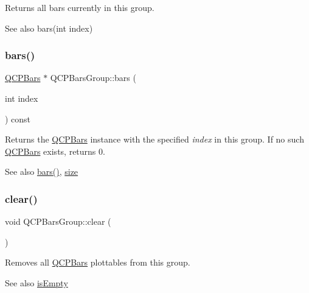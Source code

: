 Returns all bars currently in this group.

\begin{DoxySeeAlso}{See also}
bars(int index) 
\end{DoxySeeAlso}
\hypertarget{class_q_c_p_bars_group_a0754d659a020aa7fddfe81e657ce2d92}{}\label{class_q_c_p_bars_group_a0754d659a020aa7fddfe81e657ce2d92} 
\subsubsection{\texorpdfstring{bars()}{bars()}\hspace{0.1cm}{\footnotesize\ttfamily [2/2]}}
{\footnotesize\ttfamily \hyperlink{class_q_c_p_bars}{Q\+C\+P\+Bars} $\ast$ Q\+C\+P\+Bars\+Group\+::bars (\begin{DoxyParamCaption}\item[{int}]{index }\end{DoxyParamCaption}) const}

Returns the \hyperlink{class_q_c_p_bars}{Q\+C\+P\+Bars} instance with the specified {\itshape index} in this group. If no such \hyperlink{class_q_c_p_bars}{Q\+C\+P\+Bars} exists, returns 0.

\begin{DoxySeeAlso}{See also}
\hyperlink{class_q_c_p_bars_group_a6e4f4e86abbec6a9342f204ef82abef8}{bars()}, \hyperlink{class_q_c_p_bars_group_a3780ec77919cb00840207ec7a0f00dd5}{size} 
\end{DoxySeeAlso}
\hypertarget{class_q_c_p_bars_group_a3ddf23928c6cd89530bd34ab7ba7b177}{}\label{class_q_c_p_bars_group_a3ddf23928c6cd89530bd34ab7ba7b177} 
\subsubsection{\texorpdfstring{clear()}{clear()}}
{\footnotesize\ttfamily void Q\+C\+P\+Bars\+Group\+::clear (\begin{DoxyParamCaption}{ }\end{DoxyParamCaption})}

Removes all \hyperlink{class_q_c_p_bars}{Q\+C\+P\+Bars} plottables from this group.

\begin{DoxySeeAlso}{See also}
\hyperlink{class_q_c_p_bars_group_aac959e79e852e8ef9aea6e0449ad000a}{is\+Empty} 
\end{DoxySeeAlso}
\hypertarget{class_q_c_p_bars_group_ae26da07a23553052a178fb3fae90d0dc}{}\label{class_q_c_p_bars_group_ae26da07a23553052a178fb3fae90d0dc} 

